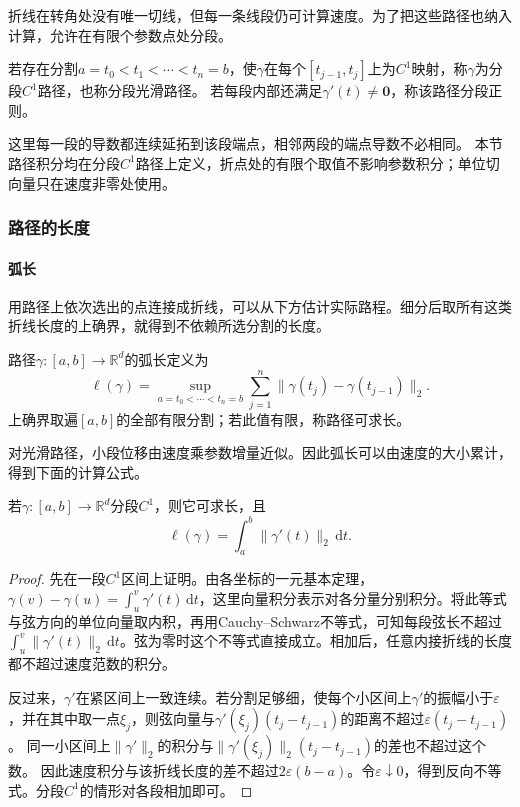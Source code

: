 折线在转角处没有唯一切线，但每一条线段仍可计算速度。为了把这些路径也纳入计算，允许在有限个参数点处分段。
\begin{definition}[分段光滑路径]
若存在分割$a=t_0<t_1<\cdots<t_n=b$，使$\gamma$在每个$[t_{j-1},t_j]$上为$C^1$映射，称$\gamma$为分段$C^1$路径，也称分段光滑路径。
若每段内部还满足$\gamma'(t)\neq\bm0$，称该路径分段正则。
\end{definition}

这里每一段的导数都连续延拓到该段端点，相邻两段的端点导数不必相同。
本节路径积分均在分段$C^1$路径上定义，折点处的有限个取值不影响参数积分；单位切向量只在速度非零处使用。

\subsubsection{路径的长度}

\paragraph{弧长}

用路径上依次选出的点连接成折线，可以从下方估计实际路程。细分后取所有这类折线长度的上确界，就得到不依赖所选分割的长度。
\begin{definition}[路径的弧长]
路径$\gamma:[a,b]\to\mathbb R^d$的弧长定义为
\[
 \ell(\gamma)=\sup_{a=t_0<\cdots<t_n=b}
 \sum_{j=1}^n\lVert\gamma(t_j)-\gamma(t_{j-1})\rVert_2.
\]
上确界取遍$[a,b]$的全部有限分割；若此值有限，称路径可求长。
\end{definition}

对光滑路径，小段位移由速度乘参数增量近似。因此弧长可以由速度的大小累计，得到下面的计算公式。
\begin{theorem}[分段光滑路径的弧长]
若$\gamma:[a,b]\to\mathbb R^d$分段$C^1$，则它可求长，且
\[
 \ell(\gamma)=\int_a^b\lVert\gamma'(t)\rVert_2\,\mathrm dt.
\]
\end{theorem}
\begin{proof}
先在一段$C^1$区间上证明。由各坐标的一元基本定理，
$\gamma(v)-\gamma(u)=\int_u^v\gamma'(t)\,\mathrm dt$，这里向量积分表示对各分量分别积分。将此等式与弦方向的单位向量取内积，再用Cauchy--Schwarz不等式，可知每段弦长不超过$\int_u^v\lVert\gamma'(t)\rVert_2\,\mathrm dt$。弦为零时这个不等式直接成立。相加后，任意内接折线的长度都不超过速度范数的积分。

反过来，$\gamma'$在紧区间上一致连续。若分割足够细，使每个小区间上$\gamma'$的振幅小于$\varepsilon$，并在其中取一点$\xi_j$，则弦向量与$\gamma'(\xi_j)(t_j-t_{j-1})$的距离不超过$\varepsilon(t_j-t_{j-1})$。
同一小区间上$\lVert\gamma'\rVert_2$的积分与$\lVert\gamma'(\xi_j)\rVert_2(t_j-t_{j-1})$的差也不超过这个数。
因此速度积分与该折线长度的差不超过$2\varepsilon(b-a)$。令$\varepsilon\downarrow0$，得到反向不等式。分段$C^1$的情形对各段相加即可。
\end{proof}

